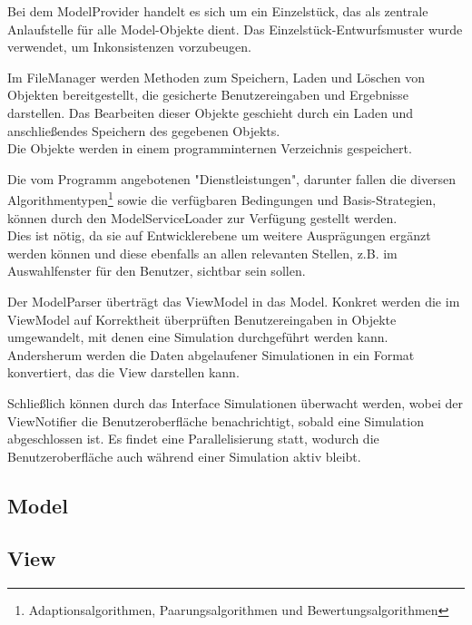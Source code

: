 Bei dem ModelProvider handelt es sich um ein Einzelstück, das als zentrale Anlaufstelle für alle Model-Objekte dient. Das Einzelstück-Entwurfsmuster wurde verwendet, um Inkonsistenzen vorzubeugen.

Im FileManager werden Methoden zum Speichern, Laden und Löschen von Objekten bereitgestellt, die gesicherte Benutzereingaben und Ergebnisse darstellen. Das Bearbeiten dieser Objekte geschieht durch ein Laden und anschließendes Speichern des gegebenen Objekts.\\
Die Objekte werden in einem programminternen Verzeichnis gespeichert.

Die vom Programm angebotenen "Dienstleistungen", darunter fallen die diversen Algorithmentypen\footnote{Adaptionsalgorithmen, Paarungsalgorithmen und Bewertungsalgorithmen} sowie die verfügbaren Bedingungen und Basis-Strategien, können durch den ModelServiceLoader zur Verfügung gestellt werden.\\
Dies ist nötig, da sie auf Entwicklerebene um weitere Ausprägungen ergänzt werden können und diese ebenfalls an allen relevanten Stellen, z.B. im Auswahlfenster für den Benutzer, sichtbar sein sollen.

Der ModelParser überträgt das ViewModel in das Model. Konkret werden die im ViewModel auf Korrektheit überprüften Benutzereingaben in Objekte umgewandelt, mit denen eine Simulation durchgeführt werden kann. Andersherum werden die Daten abgelaufener Simulationen in ein Format konvertiert, das die View darstellen kann.

Schließlich können durch das Interface Simulationen überwacht werden, wobei der ViewNotifier die Benutzeroberfläche benachrichtigt, sobald eine Simulation abgeschlossen ist. Es findet eine Parallelisierung statt, wodurch die Benutzeroberfläche auch während einer Simulation aktiv bleibt.

\subsection{Model}

\noindent
{}


\subsection{View}

\noindent
{}

